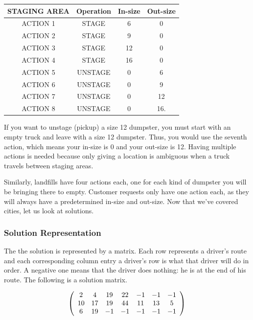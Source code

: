\documentclass{article}
\begin{document}
\vspace{5mm}
\begin{tabular}{ | c | c | c | c |}
STAGING AREA & Operation & In-size & Out-size \\
\hline ACTION 1 & STAGE & 6 &  0 \\
ACTION 2 & STAGE & 9 &  0 \\
ACTION 3 & STAGE & 12 &  0 \\
ACTION 4 & STAGE & 16 &  0 \\
ACTION 5 & UNSTAGE & 0 &  6 \\
ACTION 6 & UNSTAGE & 0 &  9 \\
ACTION 7 & UNSTAGE & 0 &  12 \\
ACTION 8 & UNSTAGE & 0 &  16. \\
\end{tabular}

\vspace{5mm}



If you want to unstage (pickup) a size 12 dumpster, you must start with an empty truck and leave with a size 12 dumpster.
Thus, you would use the seventh action, which means your in-size is 0 and your out-size is 12.  
Having multiple actions is needed because only giving a location is ambiguous when a truck travels between staging areas.

Similarly, landfills have four actions each, one for each kind of dumpster you will be bringing there to empty.  
Customer requests only have one action each, as they will always have a predetermined in-size and out-size.
Now that we’ve covered cities, let us look at solutions.


\subsubsection{Solution Representation}

The the solution is represented by a matrix.
Each row represents a driver's route and each corresponding column entry a driver's row is what that driver will do in order.
A negative one means that the driver does nothing: he is at the end of his route.
The following is a solution matrix.

\vspace{5mm}

\[
\left(
\begin{array}{  c  c  c  c  c  c  c }
2 & 4 & 19 & 22 & -1 & -1 & -1  \\
10 & 17 & 19 & 44 & 11 & 13 & 5 \\
6 & 19 & -1 & -1 & -1 & -1 & -1  \\
\end{array} \right)
\]
\end{document}
